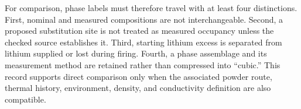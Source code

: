 For comparison, phase labels must therefore travel with at least four distinctions. First, nominal and measured compositions are not interchangeable. Second, a proposed substitution site is not treated as measured occupancy unless the checked source establishes it. Third, starting lithium excess is separated from lithium supplied or lost during firing. Fourth, a phase assemblage and its measurement method are retained rather than compressed into ``cubic.'' This record supports direct comparison only when the associated powder route, thermal history, environment, density, and conductivity definition are also compatible.

